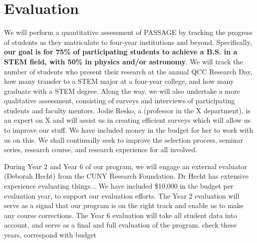 \documentclass[12pt]{article}
\newcommand\new[1]{{\color{blue}#1}}
\begin{document}
\vspace{-3mm}


\section{Evaluation}



We will perform a quantitative assessment of PASSAGE by tracking the progress of students as they matriculate to four-year institutions and beyond. Specifically, {\bf our goal is for 75\% of participating students to achieve a B.S. in a STEM field, with 50\% in physics and/or astronomy}. We will track the number of students who present their research at the annual QCC Research Day, how many transfer to a STEM major at a four-year college, and how many graduate with a STEM degree.  Along the way, we will also undertake a more qualitative assessment, consisting of surveys and interviews of participating students and faculty mentors.  \new{Jodie Resko, a (professor in the X department), is an expert on X and will assist us in creating efficient surveys which will allow us to improve our stuff.  We have included money in the budget for her to work with us on this.  } We shall continually seek to improve the selection process, seminar series, research course, and research experience for all involved.

During Year 2 and Year 6 of our program, we will engage an external evaluator (Deborah Hecht) from the CUNY Research Foundation.  \new{Dr Hecht has extensive experience evaluating things...}   We have included \$10,000 in the budget per evaluation year, to support our evaluation efforts.  The Year 2 evaluation will serve as a signal that our program is on the right track and enable us to make any course corrections.  The Year 6 evaluation will take all student data into account, and serve as a final and full evaluation of the program. \new{check these years, correspond with budget}
\vspace{-3mm}
\end{document}
